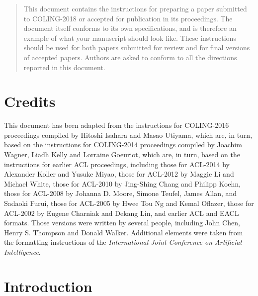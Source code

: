 \begin{abstract}
  This document contains the instructions for preparing a paper submitted
  to COLING-2018 or accepted for publication in its proceedings. The document itself
  conforms to its own specifications, and is therefore an example of
  what your manuscript should look like. These instructions should be
  used for both papers submitted for review and for final versions of
  accepted papers. Authors are asked to conform to all the directions
  reported in this document.
\end{abstract}

\section{Credits}

This document has been adapted from the instructions for  
COLING-2016 proceedings compiled by Hitoshi Isahara and Masao Utiyama,
which are, in turn, based on
the instructions for
COLING-2014 proceedings compiled by Joachim Wagner, Liadh Kelly
and Lorraine Goeuriot,
which are, in turn, based on the instructions for earlier ACL proceedings,
including 
those for ACL-2014 by Alexander Koller and Yusuke Miyao,
those for ACL-2012 by Maggie Li and Michael
White, those for ACL-2010 by Jing-Shing Chang and Philipp Koehn,
those for ACL-2008 by Johanna D. Moore, Simone Teufel, James Allan,
and Sadaoki Furui, those for ACL-2005 by Hwee Tou Ng and Kemal
Oflazer, those for ACL-2002 by Eugene Charniak and Dekang Lin, and
earlier ACL and EACL formats. Those versions were written by several
people, including John Chen, Henry S. Thompson and Donald
Walker. Additional elements were taken from the formatting
instructions of the {\em International Joint Conference on Artificial
  Intelligence}.

\section{Introduction}
\label{intro}

%
% 

